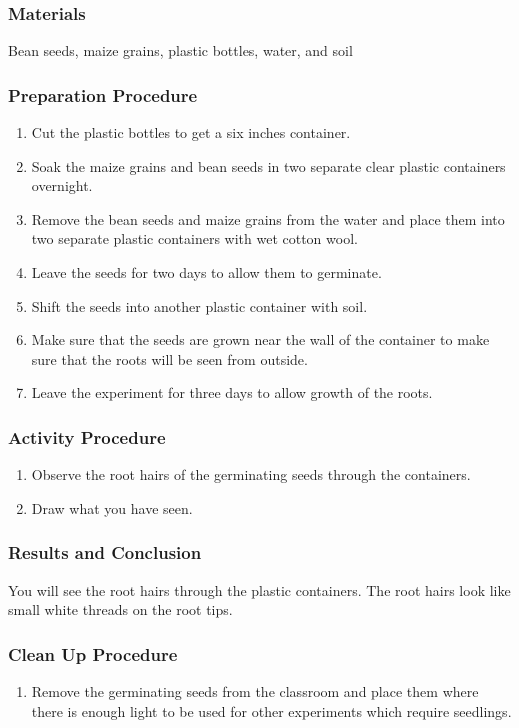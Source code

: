 \subsubsection*{Materials}
Bean seeds, maize grains, plastic bottles, water, and soil

\subsubsection*{Preparation Procedure}
\begin{enumerate}
\item{Cut the plastic bottles to get a six inches container.}
\item{Soak the maize grains and bean seeds in two separate clear plastic containers overnight.}
\item{Remove the bean seeds and maize grains from the water and place them into two separate plastic containers with wet cotton wool.}
\item{Leave the seeds for two days to allow them to germinate.}
\item{Shift the seeds into another plastic container with soil.}
\item{Make sure that the seeds are grown near the wall of the container to make sure that the roots will be seen from outside.}
\item{Leave the experiment for three days to allow growth of the roots.}
\end{enumerate}

\subsubsection*{Activity Procedure}
\begin{enumerate}
\item{Observe the root hairs of the germinating seeds through the containers.}
\item{Draw what you have seen.}
\end{enumerate}

\subsubsection*{Results and Conclusion}
You will see the root hairs through the plastic containers. The root hairs look like small white threads on the root tips.

\subsubsection*{Clean Up Procedure}
\begin{enumerate}
\item{Remove the germinating seeds from the classroom and place them where there is enough light to be used for other experiments which require seedlings.}
\end{enumerate}

